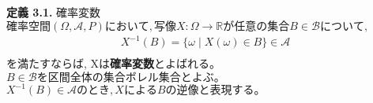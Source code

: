 \documentclass[dvipdfmx,10pt, a4j]{jarticle}
\theoremstyle{definition}
\begin{document}
\newpage
\noindent
\textbf{定義 3.1.} 確率変数\\
$確率空間 (\Omega, \mathcal{A}, P)において, 写像X: \Omega \rightarrow \mathbb{R}が任意の集合B \in \mathcal{B}について,$\\
\begin{align*}
    X^{-1}(B) = \{ \omega \mid X(\omega) \in B\} \in \mathcal{A}\\
\end{align*}
を満たすならば, Xは\textbf{確率変数}とよばれる。\\
$B \in \mathcal{B}を区間全体の集合\textbf{ボレル集合}とよぶ。$\\
$X^{-1}(B) \in \mathcal{A}のとき, XによるBの逆像と表現する。$
\end{document}
